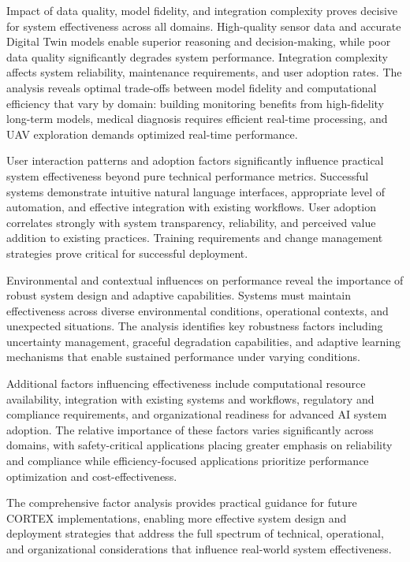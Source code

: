 Impact of data quality, model fidelity, and integration complexity proves decisive for system effectiveness across all domains. High-quality sensor data and accurate Digital Twin models enable superior reasoning and decision-making, while poor data quality significantly degrades system performance. Integration complexity affects system reliability, maintenance requirements, and user adoption rates. The analysis reveals optimal trade-offs between model fidelity and computational efficiency that vary by domain: building monitoring benefits from high-fidelity long-term models, medical diagnosis requires efficient real-time processing, and UAV exploration demands optimized real-time performance.

User interaction patterns and adoption factors significantly influence practical system effectiveness beyond pure technical performance metrics. Successful systems demonstrate intuitive natural language interfaces, appropriate level of automation, and effective integration with existing workflows. User adoption correlates strongly with system transparency, reliability, and perceived value addition to existing practices. Training requirements and change management strategies prove critical for successful deployment.

Environmental and contextual influences on performance reveal the importance of robust system design and adaptive capabilities. Systems must maintain effectiveness across diverse environmental conditions, operational contexts, and unexpected situations. The analysis identifies key robustness factors including uncertainty management, graceful degradation capabilities, and adaptive learning mechanisms that enable sustained performance under varying conditions.

Additional factors influencing effectiveness include computational resource availability, integration with existing systems and workflows, regulatory and compliance requirements, and organizational readiness for advanced AI system adoption. The relative importance of these factors varies significantly across domains, with safety-critical applications placing greater emphasis on reliability and compliance while efficiency-focused applications prioritize performance optimization and cost-effectiveness.

The comprehensive factor analysis provides practical guidance for future CORTEX implementations, enabling more effective system design and deployment strategies that address the full spectrum of technical, operational, and organizational considerations that influence real-world system effectiveness.

